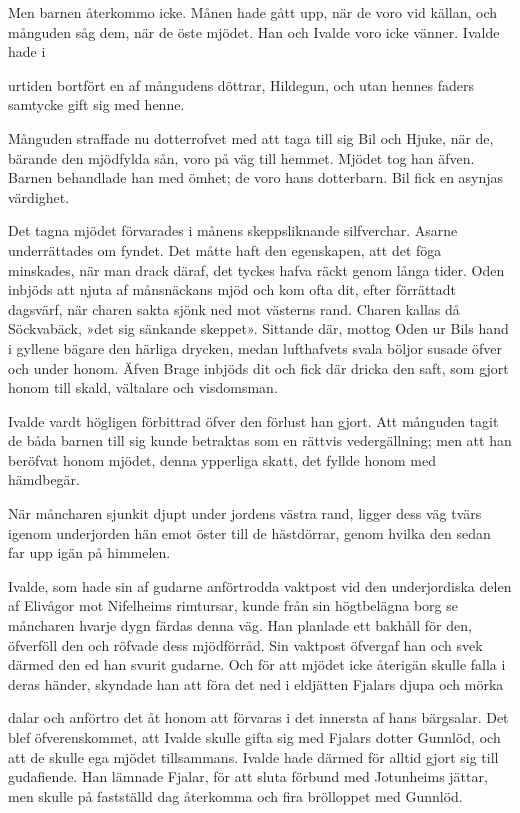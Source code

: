 Men barnen återkommo icke. Månen hade gått upp, när de voro vid källan,
och månguden såg dem, när de öste mjödet. Han och Ivalde voro icke
vänner. Ivalde hade i

urtiden bortfört en af mångudens döttrar, Hildegun, och utan hennes
faders samtycke gift sig med henne.

Månguden straffade nu dotterrofvet med att taga till sig Bil och Hjuke,
när de, bärande den mjödfylda sån, voro på väg till hemmet. Mjödet tog
han äfven. Barnen behandlade han med ömhet; de voro hans dotterbarn. Bil
fick en asynjas värdighet.

Det tagna mjödet förvarades i månens skeppsliknande silfverchar. Asarne
underrättades om fyndet. Det måtte haft den egenskapen, att det föga
minskades, när man drack däraf, det tyckes hafva räckt genom långa
tider. Oden inbjöds att njuta af månsnäckans mjöd och kom ofta dit,
efter förrättadt dagsvärf, när charen sakta sjönk ned mot västerns rand.
Charen kallas då Söckvabäck, »det sig sänkande skeppet». Sittande där,
mottog Oden ur Bils hand i gyllene bägare den härliga drycken, medan
lufthafvets svala böljor susade öfver och under honom. Äfven Brage
inbjöds dit och fick där dricka den saft, som gjort honom till skald,
vältalare och visdomsman.

Ivalde vardt högligen förbittrad öfver den förlust han gjort. Att
månguden tagit de båda barnen till sig kunde betraktas som en rättvis
vedergällning; men att han beröfvat honom mjödet, denna ypperliga skatt,
det fyllde honom med hämdbegär.

När måncharen sjunkit djupt under jordens västra rand, ligger dess väg
tvärs igenom underjorden hän emot öster till de hästdörrar, genom hvilka
den sedan far upp igän på himmelen.

Ivalde, som hade sin af gudarne anförtrodda vaktpost vid den
underjordiska delen af Elivågor mot Nifelheims rimtursar, kunde från sin
högtbelägna borg se måncharen hvarje dygn färdas denna väg. Han planlade
ett bakhåll för den, öfverföll den och röfvade dess mjödförråd. Sin
vaktpost öfvergaf han och svek därmed den ed han svurit gudarne. Och för
att mjödet icke återigän skulle falla i deras händer, skyndade han att
föra det ned i eldjätten Fjalars djupa och mörka

dalar och anförtro det åt honom att förvaras i det innersta af hans
bärgsalar. Det blef öfverenskommet, att Ivalde skulle gifta sig med
Fjalars dotter Gunnlöd, och att de skulle ega mjödet tillsammans. Ivalde
hade därmed för alltid gjort sig till gudafiende. Han lämnade Fjalar,
för att sluta förbund med Jotunheims jättar, men skulle på fastställd
dag återkomma och fira brölloppet med Gunnlöd.


